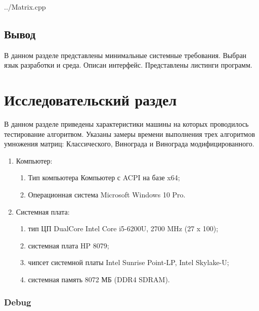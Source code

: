 \documentclass[a4paper, 14pt]{article}
\begin{document}
	 {../Matrix.cpp}
	
	
	
	
	
	\subsection{Вывод}
	
	В данном разделе представлены минимальные системные требования. Выбран язык разработки и среда. Описан интерфейс. Представлены листинги программ.
		
	\newpage
	\section{Исследовательский раздел}
	
	В данном разделе приведены характеристики машины на которых проводилось тестирование алгоритвом. Указаны замеры времени выполнения трех алгоритмов умножения матриц: Классического, Винограда и Винограда модифицированного.
	
	\begin{enumerate}
		\item Компьютер:
		\begin{enumerate}
			\item Тип компьютера   Компьютер с ACPI на базе x64;
			\item Операционная система   Microsoft Windows 10 Pro.
		\end{enumerate}
		\item Системная плата:
		\begin{enumerate}
			\item тип ЦП   DualCore Intel Core i5-6200U, 2700 MHz (27 x 100);
			\item системная плата   HP 8079;
			\item чипсет системной платы   Intel Sunrise Point-LP, Intel Skylake-U;
			\item системная память   8072 МБ (DDR4 SDRAM).
		\end{enumerate}
	\end{enumerate}
	
	\subsubsection{Debug}
	
\end{document}
